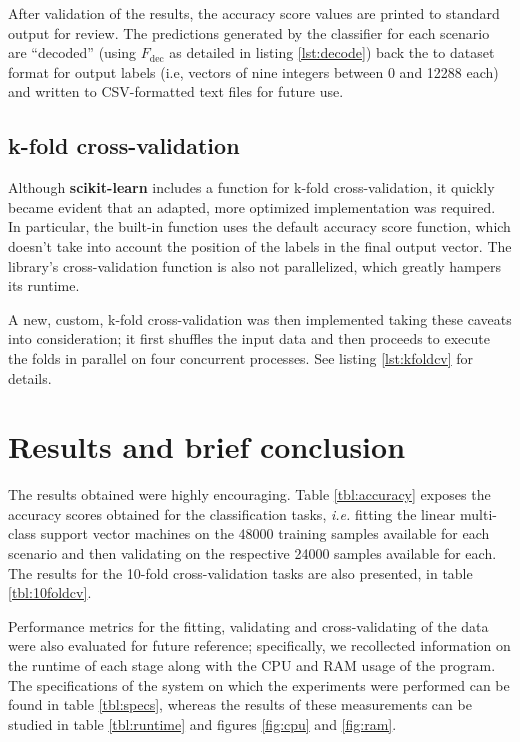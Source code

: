 \documentclass{kthreport}
\theoremstyle{definition}
\begin{document}
After validation of the results, the accuracy score values are printed to standard output for review. 
The predictions generated by the classifier for each scenario are ``decoded'' (using $F_{\text{dec}}$ as detailed in listing \ref{lst:decode}) back the to dataset format for output labels (i.e, vectors of nine integers between \num{0} and \num{12288} each) and written to CSV-formatted text files for future use.

\subsection{k-fold cross-validation}

Although \textbf{scikit-learn} includes a function for k-fold cross-validation, it quickly became evident that an adapted, more optimized implementation was required. 
In particular, the built-in function uses the default accuracy score function, which doesn't take into account the position of the labels in the final output vector. The library's cross-validation function is also not parallelized, which greatly hampers its runtime.

A new, custom, k-fold cross-validation was then implemented taking these caveats into consideration; it first shuffles the input data and then proceeds to execute the folds in parallel on four concurrent processes. See listing \ref{lst:kfoldcv} for details.


\section{Results and brief conclusion}

The results obtained were highly encouraging.
Table \ref{tbl:accuracy} exposes the accuracy scores obtained for the classification tasks, \emph{i.e.} fitting the linear multi-class support vector machines on the \num{48000} training samples available for each scenario and then validating on the respective \num{24000} samples available for each. 
The results for the \num{10}-fold cross-validation tasks are also presented, in table \ref{tbl:10foldcv}.

Performance metrics for the fitting, validating and cross-validating of the data were also evaluated for future reference; specifically, we recollected information on the runtime of each stage along with the CPU and RAM usage of the program. 
The specifications of the system on which the experiments were performed can be found in table \ref{tbl:specs}, whereas the results of these measurements can be studied in table \ref{tbl:runtime} and figures \ref{fig:cpu} and \ref{fig:ram}.
\end{document}
